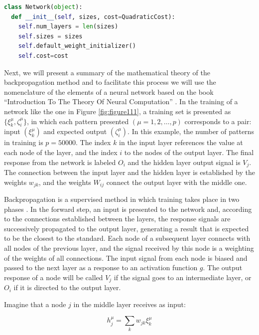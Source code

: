 \begin{lstlisting}[caption={Delta method in Python},label={lst:classnetwork},language=Python]
class Network(object):
  def __init__(self, sizes, cost=QuadraticCost):
    self.num_layers = len(sizes)
    self.sizes = sizes
    self.default_weight_initializer()
    self.cost=cost
\end{lstlisting}

Next, we will present a summary of the mathematical theory of the backpropagation method and to facilitate this process we will use the nomenclature of the elements of a neural network based on the book “Introduction To The Theory Of Neural Computation” \cite{hertz2018}. In the training of a network like the one in Figure \ref{fig:figure111}, a training set is presented as $\{\xi_k^\mu,\zeta_i^\mu\}$, in which each pattern presented $(\mu=1,2,\dots,p)$ corresponds to a pair: input $(\xi_k^\mu)$ and expected output $(\zeta_i^\mu)$. In this example, the number of patterns in training is $p=50000$. The index $k$ in the input layer references the value at each node of the layer, and the index $i$ to the nodes of the output layer. The final response from the network is labeled $O_i$ and the hidden layer output signal is $V_j$. The connection between the input layer and the hidden layer is established by the weights $w_{jk}$, and the weights $W_{ij}$ connect the output layer with the middle one.

Backpropagation is a supervised method in which training takes place in two phases \cite{haykin1999}. In the forward step, an input is presented to the network and, according to the connections established between the layers, the response signals are successively propagated to the output layer, generating a result that is expected to be the closest to the standard. Each node of a subsequent layer connects with all nodes of the previous layer, and the signal received by this node is a weighting of the weights of all connections. The input signal from each node is biased and passed to the next layer as a response to an activation function $g$. The output response of a node will be called $V_j$ if the signal goes to an intermediate layer, or $O_i$ if it is directed to the output layer.

Imagine that a node $j$ in the middle layer receives as input:

\begin{equation}
\label{xisum1}
h_j^\mu=\sum_{k}w_{jk}\xi_k^\mu
\end{equation}

